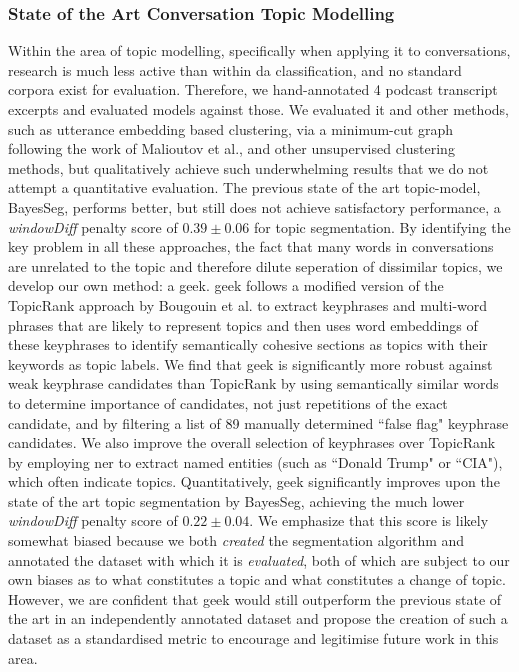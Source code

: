 \subsubsection{State of the Art Conversation Topic Modelling}
    Within the area of topic modelling, specifically when applying it to conversations, research is much less active than within \gls{da} classification, and no standard corpora exist for evaluation. Therefore, we hand-annotated 4 podcast transcript excerpts and evaluated \glspl{model} against those. We evaluated it and other methods, such as \gls{utterance} \gls{embedding} based clustering, via a minimum-cut graph following the work of Malioutov et al., and other unsupervised clustering methods, but qualitatively achieve such underwhelming results that we do not attempt a quantitative evaluation. The previous state of the art topic-\gls{model}, BayesSeg, performs better, but still does not achieve satisfactory performance, a \textit{windowDiff} penalty score of $0.39 \pm 0.06$ for topic segmentation.
    By identifying the key problem in all these approaches, the fact that many words in conversations are unrelated to the topic and therefore dilute seperation of dissimilar topics, we develop our own method: a \gls{geek}.
    \gls{geek} follows a modified version of the TopicRank approach by Bougouin et al. to extract \glspl{keyphrase} and multi-word phrases that are likely to represent topics and then uses word \glspl{embedding} of these \glspl{keyphrase} to identify semantically cohesive sections as topics with their keywords as topic labels. We find that \gls{geek} is significantly more robust against weak \gls{keyphrase} candidates than TopicRank by using semantically similar words to determine importance of candidates, not just repetitions of the exact candidate, and by filtering a list of 89 manually determined ``false flag" \gls{keyphrase} candidates. We also improve the overall selection of \glspl{keyphrase} over TopicRank by employing \gls{ner} to extract named entities (such as ``Donald Trump" or ``CIA"), which often indicate topics. Quantitatively, \gls{geek} significantly improves upon the state of the art topic segmentation by BayesSeg, achieving the much lower \textit{windowDiff} penalty score of $\mathbf{0.22 \pm 0.04}$. We emphasize that this score is likely somewhat biased because we both \textit{created} the segmentation algorithm and annotated the dataset with which it is \textit{evaluated}, both of which are subject to our own biases as to what constitutes a topic and what constitutes a change of topic. However, we are confident that \gls{geek} would still outperform the previous state of the art in an independently annotated dataset and propose the creation of such a dataset as a standardised metric to encourage and legitimise future work in this area.

